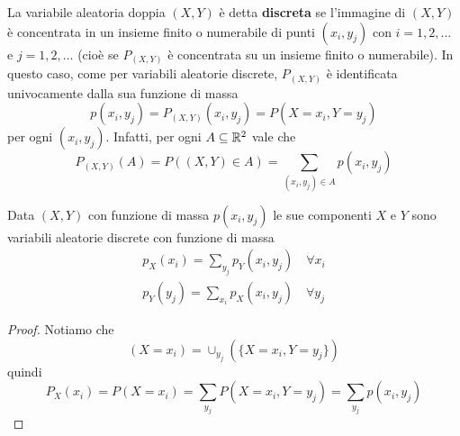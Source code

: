 \begin{definition}
	La variabile aleatoria doppia $(X,Y)$ è detta \textbf{discreta} se l'immagine di $(X,Y)$ è
	concentrata in un insieme finito o numerabile di punti $(x_i, y_j)$ con $i = 1,2,\dots$ e
	$j = 1,2,\dots$ (cioè se $P_{(X,Y)}$ è concentrata su un insieme finito o numerabile). In
	questo caso, come per variabili aleatorie discrete, $P_{(X,Y)}$ è identificata univocamente
	dalla sua funzione di massa
	\[ p(x_i, y_j) = P_{(X,Y)} (x_i, y_j) = P(X = x_i, Y = y_j) \]
	per ogni $(x_i, y_j)$. Infatti, per ogni $A \subseteq \mathbb{R}^2$ vale che
	\[ P_{(X,Y)} (A) = P((X,Y) \in A) = \sum_{(x_i, y_j) \in A} p(x_i, y_j) \]
\end{definition}

\begin{proposition}
	Data $(X, Y)$ con funzione di massa $p(x_i, y_j)$ le sue componenti $X$ e $Y$ sono variabili
	aleatorie discrete con funzione di massa
	\begin{gather*}
		p_X(x_i) = \sum_{y_j} p_Y (x_i, y_j) \quad \forall x_i \\
		p_Y(y_j) = \sum_{x_i} p_X (x_i, y_j) \quad \forall y_j
	\end{gather*}
	\begin{proof}
		Notiamo che
		\[ (X = x_i) = \cup_{y_j} (\{ X = x_i, Y = y_j \}) \]
		quindi
		\[ P_X(x_i) = P(X = x_i) = \sum_{y_j} P(X = x_i, Y = y_j) = \sum_{y_j} p(x_i, y_j) \]
	\end{proof}
\end{proposition}